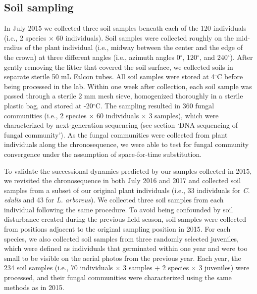 \subsection*{Soil sampling}
In July 2015 we collected three soil samples beneath each of the 120 individuals (i.e., 2 species $\times$ 60 individuals). Soil samples were collected roughly on the mid-radius of the plant individual (i.e., midway between the center and the edge of the crown) at three different angles (i.e., azimuth angles 0$^{\circ}$, 120$^{\circ}$, and 240$^{\circ}$). After gently removing the litter that covered the soil surface, we collected soils in separate sterile 50 mL Falcon tubes. 
All soil samples were stored at 4$^{\circ}$C before being processed in the lab. Within one week after collection, each soil sample was passed through a sterile 2 mm mesh sieve, homogenized thoroughly in a sterile plastic bag, and stored at -20$^{\circ}$C. 
The sampling resulted in 360 fungal communities (i.e., 2 species $\times$ 60 individuals $\times$ 3 samples), which were characterized by next-generation sequencing (see section `DNA sequencing of fungal community'). As the fungal communities were collected from plant individuals along the chronosequence, we were able to test for fungal community convergence under the assumption of space-for-time substitution.
\par


To validate the successional dynamics predicted by our samples collected in 2015, we revisited the chronosequence in both July 2016 and 2017 and collected soil samples from a subset of our original plant individuals (i.e., 33 individuals for \textit{C. edulis} and 43 for \textit{L. arboreus}). 
We collected three soil samples from each individual following the same procedure. To avoid being confounded by soil disturbance created during the previous field season, soil samples were collected from positions adjacent to the original sampling position in 2015. 
For each species, we also collected soil samples from three randomly selected juveniles, which were defined as individuals that germinated within one year and were too small to be visible on the aerial photos from the previous year. 
Each year, the  234 soil samples (i.e., 70 individuals $\times$ 3 samples + 2 species $\times$ 3 juveniles) were processed, and their fungal communities were characterized using the same methods as in 2015.
\par



